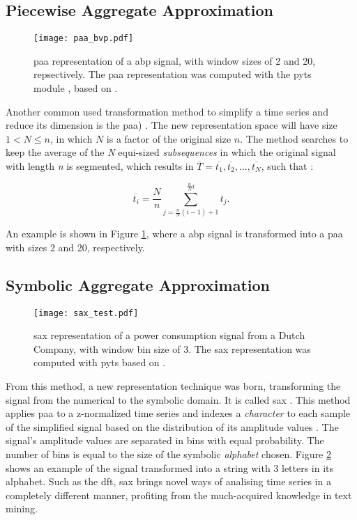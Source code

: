 \subsection{Piecewise Aggregate Approximation}
\label{subsec:paa}

\begin{figure}[!h]
\centering
\texttt{[image: paa\_bvp.pdf]}
\caption{\gls{paa} representation of a \gls{abp} signal, with window sizes of 2 and 20, repsectively. The \gls{paa} representation was computed with the \gls{pyts} module \cite{pyts}, based on \cite{paa}.}
\label{fig:paa}
\end{figure}

Another common used transformation method to simplify a time series and reduce its dimension is the \gls{paa}) \cite{paa}. The new representation space will have size $1 < N \leq n$, in which $N$ is a factor of the original size $n$. The method searches to keep the average of the \textit{N} equi-sized \textit{subsequences} in which the original signal with length \textit{n} is segmented, which results in $\overline{T} = \overline{t_1}, \overline{t_2}, ...,\overline{t_N}$, such that \cite{paa}:

\begin{equation}
\overline{t_i} = \frac{N}{n} \sum^{\frac{n}{N}i}_{j=\frac{n}{N}(i-1)+1} t_j.
\end{equation}

An example is shown in Figure \ref{fig:paa}, where a \gls{abp} signal is transformed into a \gls{paa} with sizes 2 and 20, respectively.
    
\subsection{Symbolic Aggregate Approximation}
\label{subsec:sax}

\begin{figure}
\centering
\texttt{[image: sax\_test.pdf]}
\caption{\gls{sax} representation of a power consumption signal from a Dutch Company, with window bin size of 3. The \gls{sax} representation was computed with \gls{pyts} based on \cite{sax}.}
\label{fig:sax}
\end{figure}

From this method, a new representation technique was born, transforming the signal from the numerical to the symbolic domain. It is called \gls{sax} \cite{sax}. This method applies \gls{paa} to a z-normalized time series and indexes a \textit{character} to each sample of the simplified signal based on the distribution of its amplitude values \cite{sax}. The signal's amplitude values are separated in bins with equal probability. The number of bins is equal to the size of the symbolic \textit{alphabet} chosen. Figure \ref{fig:sax} shows an example of the signal transformed into a string with 3 letters in its alphabet. Such as the \gls{dft}, \gls{sax} brings novel ways of analising time series in a completely different manner, profiting from the much-acquired knowledge in text mining.

